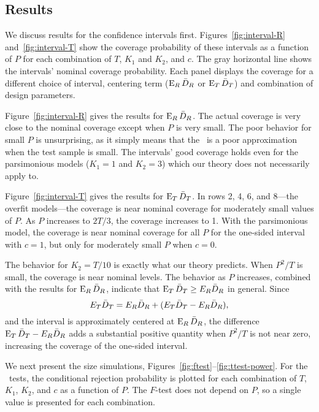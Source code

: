 \documentclass[11pt]{article}
\begin{document}
\subsection{Results}
We discuss results for the confidence intervals first.
Figures~\ref{fig:interval-R} and~\ref{fig:interval-T} show the
coverage probability of these intervals as a function of $P$ for each
combination of $T$, $K_1$ and $K_2$, and $c$.  The gray horizontal
line shows the intervals' nominal coverage probability.  Each panel
displays the coverage for a different choice of interval, centering
term ($\operatorname{E}_R \bar{D}_{R}$ or $\operatorname{E}_T \bar{D}_{T}$) and combination of design
parameters.

Figure~\ref{fig:interval-R} gives the results for $\operatorname{E}_R \bar{D}_{R}$.  The
actual coverage is very close to the nominal coverage except when $P$
is very small.  The poor behavior for small $P$ is unsurprising, as it
simply means that the \clt\ is a poor approximation when the test
sample is small.  The intervals' good coverage holds even for the
parsimonious models ($K_1=1$ and $K_2= 3$) which our theory does not
necessarily apply to.

Figure~\ref{fig:interval-T} gives the results for $\operatorname{E}_T \bar{D}_{T}$.  In
rows 2, 4, 6, and 8---the overfit models---the coverage is near
nominal coverage for moderately small values of $P$.  As $P$ increases
to $2T/3$, the coverage increases to 1.  With the parsimonious model,
the coverage is near nominal coverage for all $P$ for the one-sided
interval with $c=1$, but only for moderately small $P$ when $c=0$.

The behavior for $K_2 = T/10$ is exactly what our theory predicts.
When $P^2/T$ is small, the coverage is near nominal levels.  The
behavior as $P$ increases, combined with the results for $\operatorname{E}_R
\bar{D}_{R}$, indicate that $\operatorname{E}_T \bar{D}_{T} \geq E_R \bar{D}_{R}$ in general.
Since
\[E_{T} \bar{D}_{T} = E_{R} \bar{D}_{R} + (E_{T} \bar{D}_{T} - E_{R} \bar{D}_{R}), \] and the
interval is approximately centered at $\operatorname{E}_R \bar{D}_{R}$, the difference
$\operatorname{E}_{T} \bar{D}_{T} - E_{R} \bar{D}_{R}$ adds a substantial positive quantity when
$P^2/T$ is not near zero, increasing the coverage of the one-sided
interval.

We next present the size simulations,
Figures~\ref{fig:ftest}--\ref{fig:ttest-power}.  For the \oos\ tests,
the conditional rejection probability is plotted for each combination
of $T$, $K_1$, $K_2$, and $c$ as a function of $P$.  The $F$-test does
not depend on $P$, so a single value is presented for each
combination.
\end{document}
